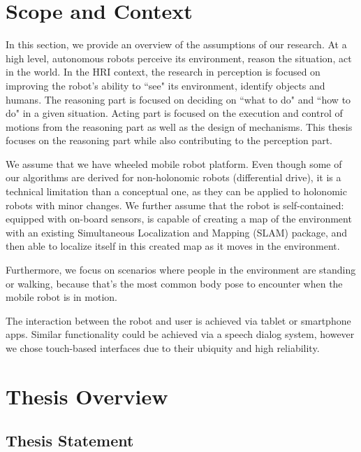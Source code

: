 \documentclass[12pt]{gatech-thesis}
\begin{document}

\section{Scope and Context}

In this section, we provide an overview of the assumptions of our research.  At a high level, autonomous robots perceive its environment, reason the situation, act in the world. In the HRI context, the research in perception is focused on improving the robot's ability to ``see" its environment, identify objects and humans. The reasoning part is focused on deciding on ``what to do" and ``how to do" in a given situation. Acting part is focused on the execution and control of motions from the reasoning part as well as the design of mechanisms. This thesis focuses on the reasoning part while also contributing to the perception part.

We assume that we have wheeled mobile robot platform. Even though some of our algorithms are derived for non-holonomic robots (differential drive), it is a technical limitation than a conceptual one, as they can be applied to holonomic robots with minor changes. We further assume that the robot is self-contained: equipped with on-board sensors, is capable of creating a map of the environment with an existing Simultaneous Localization and Mapping (SLAM) package, and then able to localize itself in this created map as it moves in the environment.

Furthermore, we focus on scenarios where people in the environment are standing or walking, because that's the most common body pose to encounter when the mobile robot is in motion.

The interaction between the robot and user is achieved via tablet or smartphone apps. Similar functionality could be achieved via a speech dialog system, however we chose touch-based interfaces due to their ubiquity and high reliability.

\section{Thesis Overview}
\subsection{Thesis Statement}

\end{document}
